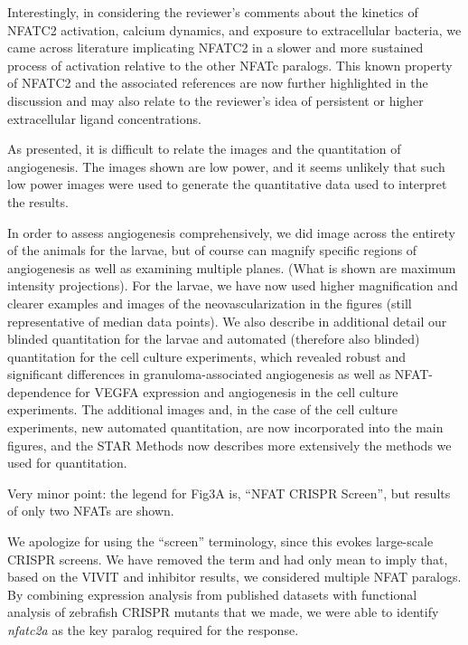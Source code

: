 \begin{description}[style=multiline, labelwidth=\widthof{Reviewer \#2:   }, font=\normalfont, leftmargin=\labelwidth, align=right]
\item \quad Interestingly, in considering the reviewer’s comments about the kinetics of NFATC2 activation, calcium dynamics, and exposure to extracellular bacteria, we came across literature implicating NFATC2 in a slower and more sustained process of activation relative to the other NFATc paralogs. This known property of NFATC2 and the associated references are now further highlighted in the discussion \citep{Kar2015, Kar2016} and may also relate to the reviewer’s idea of persistent or higher extracellular ligand concentrations.

\item[Reviewer \#1: ] \quad As presented, it is difficult to relate the images and the quantitation of angiogenesis. The images shown are low power, and it seems unlikely that such low power images were used to generate the quantitative data used to interpret the results.

\item[Response: ] \quad In order to assess angiogenesis comprehensively, we did image across the entirety of the animals for the larvae, but of course can magnify specific regions of angiogenesis as well as examining multiple planes. (What is shown are maximum intensity projections). For the larvae, we have now used higher magnification and clearer examples and images of the neovascularization in the figures (still representative of median data points). We also describe in additional detail our blinded quantitation for the larvae and automated (therefore also blinded) quantitation for the cell culture experiments, which revealed robust and significant differences in granuloma\hyp{}associated angiogenesis as well as NFAT\hyp{}dependence for VEGFA expression and angiogenesis in the cell culture experiments. The additional images and, in the case of the cell culture experiments, new automated quantitation, are now incorporated into the main figures, and the STAR Methods now describes more extensively the methods we used for quantitation.

\item[Reviewer \#1: ] \quad Very minor point: the legend for Fig3A is, “NFAT CRISPR Screen”, but results of only two NFATs are shown.

\item[Response: ] \quad We apologize for using the “screen” terminology, since this evokes large\hyp{}scale CRISPR screens. We have removed the term and had only mean to imply that, based on the VIVIT and inhibitor results, we considered multiple NFAT paralogs. By combining expression analysis from published datasets with functional analysis of zebrafish CRISPR mutants that we made, we were able to identify \textit{nfatc2a} as the key paralog required for the response.


\end{description}
